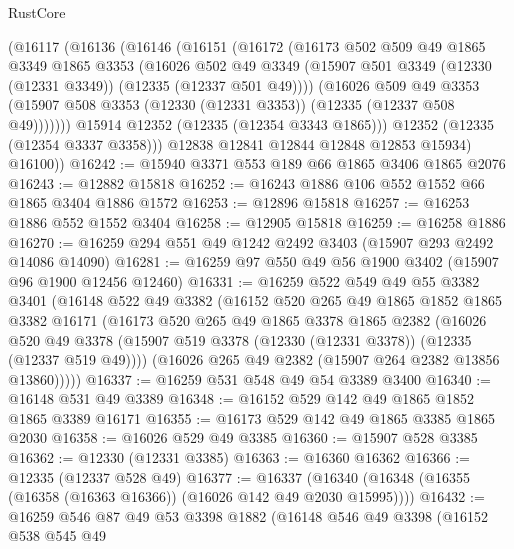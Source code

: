 \begin{lexlean}{RustCore}
\begin{coremodule}
        (@16117
          (@16136
            (@16146
              (@16151
                (@16172
                  (@16173
                    @502
                    @509
                    @49
                    @1865
                    @3349
                    @1865
                    @3353
                    (@16026
                      @502
                      @49
                      @3349
                      (@15907 @501 @3349 (@12330 (@12331 @3349)) (@12335 (@12337 @501 @49))))
                    (@16026
                      @509
                      @49
                      @3353
                      (@15907 @508 @3353 (@12330 (@12331 @3353)) (@12335 (@12337 @508 @49)))))))
              @15914
              @12352
              (@12335 (@12354 @3343 @1865)))
            @12352
            (@12335 (@12354 @3337 @3358)))
          @12838
          @12841
          @12844
          @12848
          @12853
          @15934)
        @16100))
@16242 := @15940 @3371 @553 @189 @66 @1865 @3406 @1865 @2076
@16243 := @12882 @15818
@16252 := @16243 @1886 @106 @552 @1552 @66 @1865 @3404 @1886 @1572
@16253 := @12896 @15818
@16257 := @16253 @1886 @552 @1552 @3404
@16258 := @12905 @15818
@16259 := @16258 @1886
@16270 := @16259 @294 @551 @49 @1242 @2492 @3403 (@15907 @293 @2492 @14086 @14090)
@16281 := @16259 @97 @550 @49 @56 @1900 @3402 (@15907 @96 @1900 @12456 @12460)
@16331 := @16259
    @522
    @549
    @49
    @55
    @3382
    @3401
    (@16148
      @522
      @49
      @3382
      (@16152
        @520
        @265
        @49
        @1865
        @1852
        @1865
        @3382
        @16171
        (@16173
          @520
          @265
          @49
          @1865
          @3378
          @1865
          @2382
          (@16026
            @520
            @49
            @3378
            (@15907 @519 @3378 (@12330 (@12331 @3378)) (@12335 (@12337 @519 @49))))
          (@16026 @265 @49 @2382 (@15907 @264 @2382 @13856 @13860)))))
@16337 := @16259 @531 @548 @49 @54 @3389 @3400
@16340 := @16148 @531 @49 @3389
@16348 := @16152 @529 @142 @49 @1865 @1852 @1865 @3389 @16171
@16355 := @16173 @529 @142 @49 @1865 @3385 @1865 @2030
@16358 := @16026 @529 @49 @3385
@16360 := @15907 @528 @3385
@16362 := @12330 (@12331 @3385)
@16363 := @16360 @16362
@16366 := @12335 (@12337 @528 @49)
@16377 := @16337 (@16340 (@16348 (@16355 (@16358 (@16363 @16366)) (@16026 @142 @49 @2030 @15995))))
@16432 := @16259
    @546
    @87
    @49
    @53
    @3398
    @1882
    (@16148
      @546
      @49
      @3398
      (@16152
        @538
        @545
        @49

\end{coremodule}
\end{lexlean}
